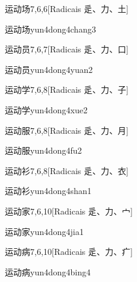 \begin{entry}{运动场}{7,6,6}[Radicais ⾡、⼒、⼟]
  \begin{phonetics}{运动场}{yun4dong4chang3}
  \end{phonetics}
\end{entry}

\begin{entry}{运动员}{7,6,7}[Radicais ⾡、⼒、⼝]
  \begin{phonetics}{运动员}{yun4dong4yuan2}
  \end{phonetics}
\end{entry}

\begin{entry}{运动学}{7,6,8}[Radicais ⾡、⼒、⼦]
  \begin{phonetics}{运动学}{yun4dong4xue2}
  \end{phonetics}
\end{entry}

\begin{entry}{运动服}{7,6,8}[Radicais ⾡、⼒、⽉]
  \begin{phonetics}{运动服}{yun4dong4fu2}
  \end{phonetics}
\end{entry}

\begin{entry}{运动衫}{7,6,8}[Radicais ⾡、⼒、⾐]
  \begin{phonetics}{运动衫}{yun4dong4shan1}
  \end{phonetics}
\end{entry}

\begin{entry}{运动家}{7,6,10}[Radicais ⾡、⼒、⼧]
  \begin{phonetics}{运动家}{yun4dong4jia1}
  \end{phonetics}
\end{entry}

\begin{entry}{运动病}{7,6,10}[Radicais ⾡、⼒、⽧]
  \begin{phonetics}{运动病}{yun4dong4bing4}
  \end{phonetics}
\end{entry}

